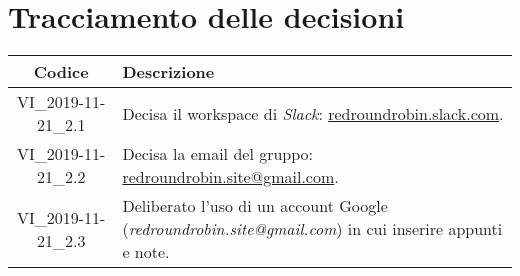 \section*{Tracciamento delle decisioni}

\begin{center}
	\begin{longtable}{|c|p{12.25cm}|}
	\hline
	\rowcolor{lighter-grayer}
	\textbf{Codice} & \textbf{Descrizione} \\
	\hline
	\endfirsthead

	\hline
	VI\_2019-11-21\_2.1 & Decisa il workspace di \textit{Slack}: \href{http://redroundrobin.slack.com}{redroundrobin.slack.com}. \\
	\hline
	VI\_2019-11-21\_2.2 & Decisa la email del gruppo: \href{mailto:redroundrobin.site@gmail.com}{redroundrobin.site@gmail.com}. \\
	\hline
	VI\_2019-11-21\_2.3 & Deliberato l'uso di un account Google (\textit{redroundrobin.site@gmail.com}) in cui inserire appunti e note. \\
	\hline

	\end{longtable}
\end{center}
